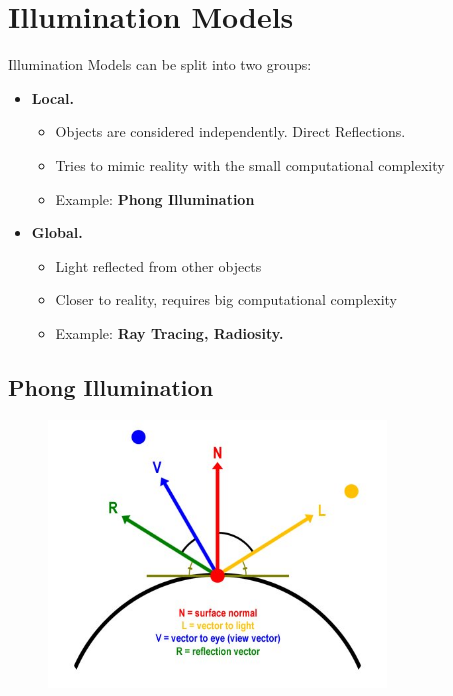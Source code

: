 \documentclass{mini}
\begin{document}
\section{Illumination Models}


Illumination Models can be split into two groups:
\begin{itemize}
    \item {\bf Local.}
    \begin{itemize}
        \item Objects are considered independently. Direct Reflections.
        \item Tries to mimic reality with the small computational complexity
        \item Example: {\bf Phong Illumination}
    \end{itemize}
    
    \item {\bf Global.}
    \begin{itemize}
        \item Light reflected from other objects
        \item Closer to reality, requires big computational complexity 
        \item Example: {\bf Ray Tracing, Radiosity.}
    \end{itemize}
\end{itemize}

\subsection{Phong Illumination}

\begin{figure}[H]
    \centering
    \includegraphics[width=0.8\textwidth]{./images/phong.jpg}
    \caption{}
    \label{fig:phong}
\end{figure}
\end{document}
